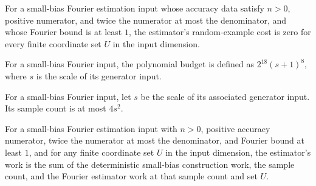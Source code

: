 \begin{theorem}
\label{FABL.deterministicSmallBiasFourierEstimatorCost_randomExamples}
\leanok
{}
For a small-bias Fourier estimation input whose accuracy data satisfy $n>0$, positive
numerator, and twice the numerator at most the denominator, and whose Fourier bound is
at least $1$, the estimator's random-example cost is zero for every finite coordinate
set $U$ in the input dimension.
\end{theorem}

\begin{definition}
\label{FABL.SmallBiasFourierInput.polynomialBudget}
\leanok
{}
For a small-bias Fourier input, the polynomial budget is defined as $2^{18}(s+1)^8$,
where $s$ is the scale of its generator input.
\end{definition}

\begin{theorem}
\label{FABL.SmallBiasFourierInput.sampleCount_le_four_mul_scale_sq}
\leanok
{}
For a small-bias Fourier input, let $s$ be the scale of its associated generator input.
Its sample count is at most $4s^2$.
\end{theorem}

\begin{theorem}
\label{FABL.deterministicSmallBiasFourierEstimatorCost_work}
\leanok
{}
For a small-bias Fourier estimation input with $n>0$, positive accuracy numerator, twice
the numerator at most the denominator, and Fourier bound at least $1$, and for any
finite coordinate set $U$ in the input dimension, the estimator's work is the sum of the
deterministic small-bias construction work, the sample count, and the Fourier estimator
work at that sample count and set $U$.
\end{theorem}

